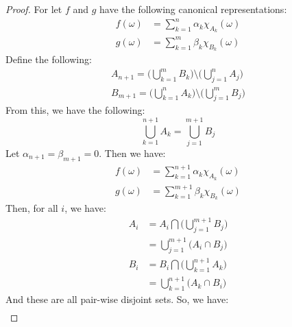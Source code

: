             \begin{proof}
                For let $f$ and $g$ have the following
                canonical representations:
                \begin{align}
                    f(\omega)&=\sum_{k=1}^{n}\alpha_{k}
                        \chi_{A_{k}}(\omega)\\
                    g(\omega)&=\sum_{k=1}^{m}\beta_{k}
                        \chi_{B_{k}}(\omega)
                \end{align}
                Define the following:
                \begin{align}
                    A_{n+1}
                    =\Big(\bigcup_{k=1}^{m}B_{k}\Big)\setminus
                        \Big(\bigcup_{j=1}^{n}A_{j}\Big)\\
                    B_{m+1}
                    =\Big(\bigcup_{k=1}^{n}A_{k}\Big)\setminus
                        \Big(\bigcup_{j=1}^{m}B_{j}\Big)
                \end{align}
                From this, we have the following:
                \begin{equation}
                    \bigcup_{k=1}^{n+1}A_{k}=
                    \bigcup_{j=1}^{m+1}B_{j}
                \end{equation}
                Let $\alpha_{n+1}=\beta_{m+1}=0$. Then we have:
                \begin{align}
                    f(\omega)&=\sum_{k=1}^{n+1}\alpha_{k}
                        \chi_{A_{k}}(\omega)\\
                    g(\omega)&=\sum_{k=1}^{m+1}\beta_{k}
                        \chi_{B_{k}}(\omega)
                \end{align}
                Then, for all $i$, we have:
                \begin{align}
                    A_{i}&=A_{i}\bigcap
                        \Big(\bigcup_{j=1}^{m+1}B_{j}\Big)\\
                    &=\bigcup_{j=1}^{m+1}
                        \Big(A_{i}\cap{B}_{j}\Big)\\
                    B_{i}&=B_{i}\bigcap
                        \Big(\bigcup_{k=1}^{n+1}A_{k}\Big)\\
                    &=\bigcup_{k=1}^{n+1}
                        \Big(A_{k}\cap{B}_{i}\Big)
                \end{align}
                And these are all pair-wise disjoint sets.
                So, we have:
                \begin{align}

\end{align}
\end{proof}
